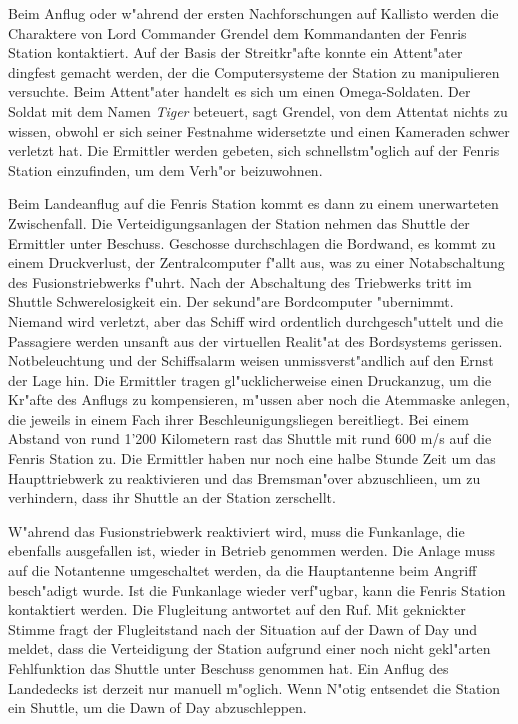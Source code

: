 
Beim Anflug oder w"ahrend der ersten Nachforschungen auf Kallisto werden die Charaktere von Lord Commander Grendel dem Kommandanten der Fenris Station kontaktiert. Auf der Basis der Streitkr"afte konnte ein Attent"ater dingfest gemacht werden, der die Computersysteme der Station zu manipulieren versuchte. Beim Attent"ater handelt es sich um einen Omega-Soldaten. Der Soldat mit dem Namen \emph{Tiger} beteuert, sagt Grendel, von dem Attentat nichts zu wissen, obwohl er sich seiner Festnahme widersetzte und einen Kameraden schwer verletzt hat. Die Ermittler werden gebeten, sich schnellstm"oglich auf der Fenris Station einzufinden, um dem Verh"or beizuwohnen.

Beim Landeanflug auf die Fenris Station kommt es dann zu einem unerwarteten Zwischenfall. Die Verteidigungsanlagen der Station nehmen das Shuttle der Ermittler unter Beschuss. Geschosse durchschlagen die Bordwand, es kommt zu einem Druckverlust, der Zentralcomputer f"allt aus, was zu einer Notabschaltung des Fusionstriebwerks f"uhrt. Nach der Abschaltung des Triebwerks tritt im Shuttle Schwerelosigkeit ein. Der sekund"are Bordcomputer "ubernimmt. Niemand wird verletzt, aber das Schiff wird ordentlich durchgesch"uttelt und die Passagiere werden unsanft aus der virtuellen Realit"at des Bordsystems gerissen. Notbeleuchtung und der Schiffsalarm weisen unmissverst"andlich auf den Ernst der Lage hin. Die Ermittler tragen gl"ucklicherweise einen Druckanzug, um die Kr"afte des Anflugs zu kompensieren, m"ussen aber noch die Atemmaske anlegen, die jeweils in einem Fach ihrer Beschleunigungsliegen bereitliegt. Bei einem Abstand von rund 1'200 Kilometern rast das Shuttle mit rund 600 m/s auf die Fenris Station zu. Die Ermittler haben nur noch eine halbe Stunde Zeit um das Haupttriebwerk zu reaktivieren und das Bremsman"over abzuschlie\3en, um zu verhindern, dass ihr Shuttle an der Station zerschellt.

W"ahrend das Fusionstriebwerk reaktiviert wird, muss die Funkanlage, die ebenfalls ausgefallen ist, wieder in Betrieb genommen werden. Die Anlage muss auf die Notantenne umgeschaltet werden, da die Hauptantenne beim Angriff besch"adigt wurde. Ist die Funkanlage wieder verf"ugbar, kann die Fenris Station kontaktiert werden. Die Flugleitung antwortet auf den Ruf. Mit geknickter Stimme fragt der Flugleitstand nach der Situation auf der Dawn of Day und meldet, dass die Verteidigung der Station aufgrund einer noch nicht gekl"arten Fehlfunktion das Shuttle unter Beschuss genommen hat. Ein Anflug des Landedecks ist derzeit nur manuell m"oglich. Wenn N"otig entsendet die Station ein Shuttle, um die Dawn of Day abzuschleppen.

